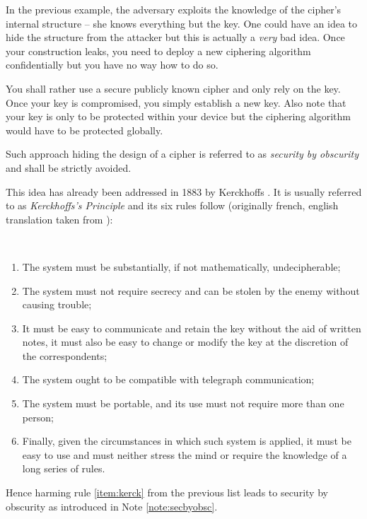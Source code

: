 \begin{note}
\label{note:secbyobsc}
	In the previous example, the adversary exploits the knowledge of the cipher's internal structure -- she knows everything but the key. One could have an idea to hide the structure from the attacker but this is actually a {\em very} bad idea. Once your construction leaks, you need to deploy a new ciphering algorithm confidentially but you have no way how to do so.
	
	You shall rather use a secure publicly known cipher and only rely on the key. Once your key is compromised, you simply establish a new key. Also note that your key is only to be protected within your device but the ciphering algorithm would have to be protected globally.
	
	Such approach hiding the design of a cipher is referred to as {\em security by obscurity} and shall be strictly avoided.
\end{note}

This idea has already been addressed in 1883 by Kerckhoffs \cite{auguste1883cryptographie}. It is usually referred to as {\em Kerckhoffs's Principle} and its six rules follow (originally french, english translation taken from \cite{petitcolas2016kerckhoffs}):
\begin{princ}[Kerckhoffs]
	~
	\begin{enumerate}
		\item The system must be substantially, if not mathematically, undecipherable;
		\item The system must not require secrecy and can be stolen by the enemy without causing trouble;\label{item:kerck}
		\item It must be easy to communicate and retain the key without the aid of written notes, it must also be easy to change or modify the key at the discretion of the correspondents;
		\item The system ought to be compatible with telegraph communication;
		\item The system must be portable, and its use must not require more than one person;
		\item Finally, given the circumstances in which such system is applied, it must be easy to use and must neither stress the mind or require the knowledge of a long series of rules.
	\end{enumerate}
\end{princ}
Hence harming rule \ref{item:kerck} from the previous list leads to security by obscurity as introduced in Note \ref{note:secbyobsc}.

